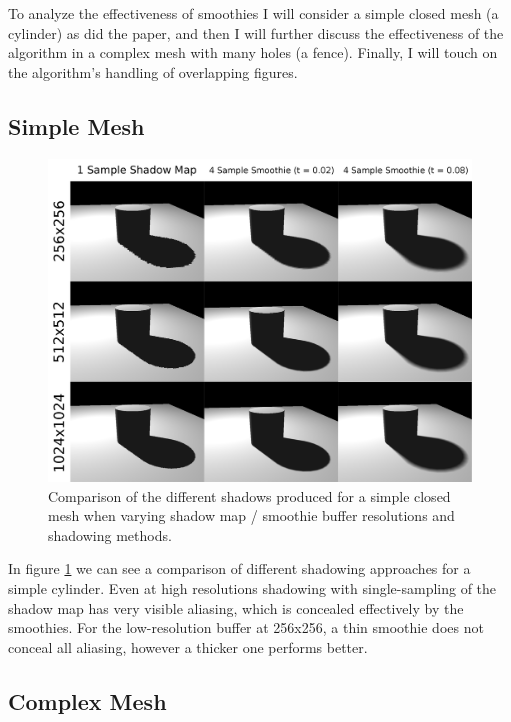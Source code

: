 \documentclass[sigconf]{acmart}
\begin{document}
To analyze the effectiveness of smoothies I will consider a simple closed mesh (a cylinder) as did the paper, and then I will further discuss the effectiveness of the algorithm in a complex mesh with many holes (a fence). Finally, I will touch on the algorithm's handling of overlapping figures.

\subsection{Simple Mesh}

\begin{figure}[t]
    \includegraphics[width=\linewidth]{reportfiles/simple-visuals}
    \caption{Comparison of the different shadows produced for a simple closed mesh when varying shadow map / smoothie buffer resolutions and shadowing methods.}
    \label{fig:simple-visuals}
\end{figure}

In figure \ref{fig:simple-visuals} we can see a comparison of different shadowing approaches for a simple cylinder. Even at high resolutions shadowing with single-sampling of the shadow map has very visible aliasing, which is concealed effectively by the smoothies. For the low-resolution buffer at 256x256, a thin smoothie does not conceal all aliasing, however a thicker one performs better.

\subsection{Complex Mesh}
\end{document}

